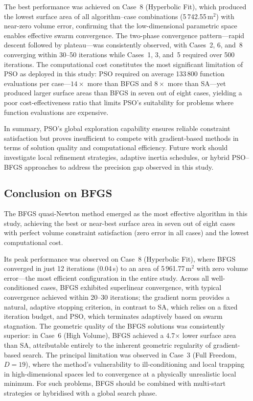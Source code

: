 The best performance was achieved on Case~8 (Hyperbolic Fit), which produced the lowest surface area of all algorithm--case combinations (5\,742.55\,m$^2$) with near-zero volume error, confirming that the low-dimensional parametric space enables effective swarm convergence. The two-phase convergence pattern---rapid descent followed by plateau---was consistently observed, with Cases~2, 6, and~8 converging within 30--50 iterations while Cases~1, 3, and~5 required over 500 iterations. The computational cost constitutes the most significant limitation of PSO as deployed in this study: PSO required on average 133\,800 function evaluations per case---$14\times$ more than BFGS and $8\times$ more than SA---yet produced larger surface areas than BFGS in seven out of eight cases, yielding a poor cost-effectiveness ratio that limits PSO's suitability for problems where function evaluations are expensive.

In summary, PSO's global exploration capability ensures reliable constraint satisfaction but proves insufficient to compete with gradient-based methods in terms of solution quality and computational efficiency. Future work should investigate local refinement strategies, adaptive inertia schedules, or hybrid PSO--BFGS approaches to address the precision gap observed in this study.

\subsection{Conclusion on BFGS}

The BFGS quasi-Newton method emerged as the most effective algorithm in this study, achieving the best or near-best surface area in seven out of eight cases with perfect volume constraint satisfaction (zero error in all cases) and the lowest computational cost.

Its peak performance was observed on Case~8 (Hyperbolic Fit), where BFGS converged in just 12 iterations (0.04\,s) to an area of 5\,961.77\,m$^2$ with zero volume error---the most efficient configuration in the entire study. Across all well-conditioned cases, BFGS exhibited superlinear convergence, with typical convergence achieved within 20--30 iterations; the gradient norm provides a natural, adaptive stopping criterion, in contrast to SA, which relies on a fixed iteration budget, and PSO, which terminates adaptively based on swarm stagnation. The geometric quality of the BFGS solutions was consistently superior: in Case~6 (High Volume), BFGS achieved a 4.7$\times$ lower surface area than SA, attributable entirely to the inherent geometric regularity of gradient-based search. The principal limitation was observed in Case~3 (Full Freedom, $D = 19$), where the method's vulnerability to ill-conditioning and local trapping in high-dimensional spaces led to convergence at a physically unrealistic local minimum. For such problems, BFGS should be combined with multi-start strategies or hybridised with a global search phase.

